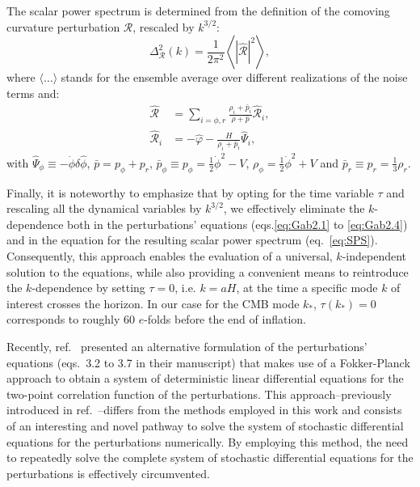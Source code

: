 \documentclass[a4paper,11pt]{article}
\begin{document}
The scalar power spectrum is determined from the definition of the comoving curvature perturbation $\mathcal{R}$, rescaled by $k^{3/2}$:
\begin{equation}
    \Delta^2_{\mathcal{R}}(k)=\frac{1}{2 \pi^2}\left\langle|\hat{\mathcal{R}}|^2\right\rangle, \label{eq:SPS}
\end{equation}
where $\langle \dots \rangle$ stands for the ensemble average over different realizations of the noise terms and:
\begin{align}
    \hat{\mathcal{R}}&=\sum_{i=\phi, r} \frac{\rho_i+\bar{p}_i}{\rho+\bar{p}} \hat{\mathcal{R}}_i, \\
    \hat{\mathcal{R}}_i&=-\hat{\varphi}-\frac{H}{\rho_i+\bar{p}_i} \hat{\Psi}_i,
\end{align}
with $\hat{\Psi}_\phi\equiv -\dot{\phi}\delta \hat{\phi}$, $\bar{p}=p_\phi+p_r$, $\bar{p}_\phi \equiv p_\phi=\frac{1}{2}\dot{\phi}^2-V$, $\rho_\phi=\frac{1}{2}\dot{\phi}^2+V$ and $\bar{p}_r\equiv p_r=\frac{1}{3}\rho_r$. 

Finally, it is noteworthy to emphasize that by opting for the time variable $\tau$ and rescaling all the dynamical variables by $k^{3/2}$, we effectively eliminate the $k$-dependence both in the perturbations’ equations (eqs.\ref{eq:Gab2.1} to \ref{eq:Gab2.4}) and in the equation for the resulting scalar power spectrum (eq.~\eqref{eq:SPS}). Consequently, this approach enables the evaluation of a universal, $k$-independent solution to the equations, while also providing a convenient means to reintroduce the $k$-dependence by setting $\tau = 0$, i.e. $k=aH$, at the time a specific mode $k$ of interest crosses the horizon. In our case for the CMB mode $k_{*}$, $\tau(k_*)=0$ corresponds to roughly 60 $e$-folds before the end of inflation.

Recently, ref.~\cite{Ballesteros:2023dno} presented an alternative formulation of the perturbations' equations (eqs.~3.2 to 3.7 in their manuscript) that  makes use of a Fokker-Planck approach to obtain a system of deterministic linear
differential equations for the two-point correlation function of the perturbations. This approach--previously introduced in ref.~\cite{Ballesteros:2022hjk}--differs from the methods employed in this work and consists of an interesting and novel pathway to solve the system of stochastic differential equations for the perturbations numerically. By employing this method, the need to repeatedly solve the complete system of stochastic differential equations for the perturbations is effectively circumvented.
\end{document}
